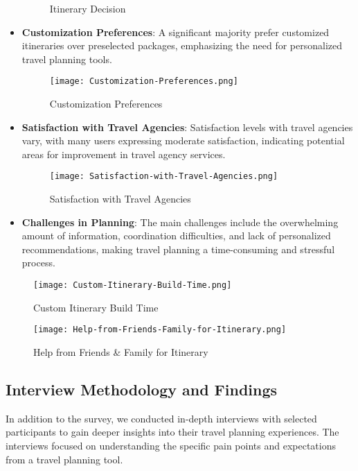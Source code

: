 \documentclass[conference]{IEEEtran}
\begin{document}
\begin{itemize}
\begin{figure}
                \caption{Itinerary Decision}
                \label{fig:itenary-decision}
            \end{figure}
            \item \textbf{Customization Preferences}: A significant majority prefer customized itineraries over preselected packages, emphasizing the need for personalized travel planning tools.
            \begin{figure}
                \centering
                \texttt{[image: Customization-Preferences.png]}
                \caption{Customization Preferences}
                \label{fig:customization-preferences}
            \end{figure}
            \item \textbf{Satisfaction with Travel Agencies}: Satisfaction levels with travel agencies vary, with many users expressing moderate satisfaction, indicating potential areas for improvement in travel agency services.
            \begin{figure}
                \centering
                \texttt{[image: Satisfaction-with-Travel-Agencies.png]}
                \caption{Satisfaction with Travel Agencies}
                \label{fig:satisfaction-with-travel-agencies}
            \end{figure}
            \item \textbf{Challenges in Planning}: The main challenges include the overwhelming amount of information, coordination difficulties, and lack of personalized recommendations, making travel planning a time-consuming and stressful process.
        \end{itemize}
            \begin{figure}
                \centering
                \texttt{[image: Custom-Itinerary-Build-Time.png]}
                \caption{Custom Itinerary Build Time}
                \label{fig:custom-itinerary-build-time}
            \end{figure}
            \begin{figure}
                \centering
                \texttt{[image: Help-from-Friends-Family-for-Itinerary.png]}
                \caption{Help from Friends & Family for Itinerary}
                \label{fig:help-from-friends-family-for-itinerary}
            \end{figure}

    \subsection{Interview Methodology and Findings}
        In addition to the survey, we conducted in-depth interviews with selected participants to gain deeper insights into their travel planning experiences. The interviews focused on understanding the specific pain points and expectations from a travel planning tool.
        \\
\end{document}

